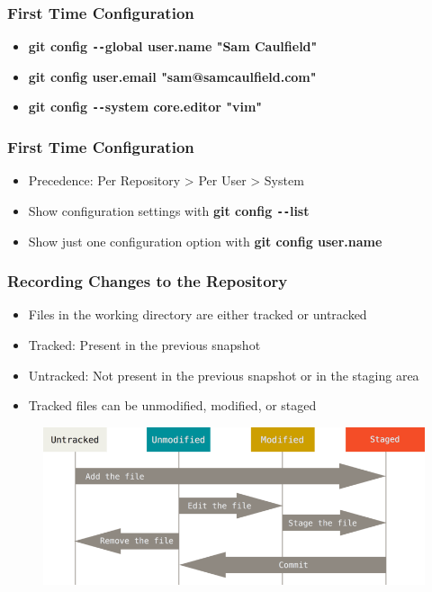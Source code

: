 \documentclass{beamer}
\begin{document}
\begin{frame}
	\frametitle{First Time Configuration}
	\begin{itemize}
		\item{\textbf{git config \texttt{-{}-}global user.name "Sam Caulfield"}}
		\item{\textbf{git config user.email "sam@samcaulfield.com"}}
		\item{\textbf{git config \texttt{-{}-}system core.editor "vim"}}
	\end{itemize}
\end{frame}

\begin{frame}
	\frametitle{First Time Configuration}
	\begin{itemize}
		\item{Precedence: Per Repository \textgreater{} Per User \textgreater{} System}
		\item{Show configuration settings with \textbf{git config \texttt{-{}-}list}}
		\item{Show just one configuration option with \textbf{git config user.name}}
	\end{itemize}

\end{frame}


\begin{frame}
	\frametitle{Recording Changes to the Repository}
	\begin{itemize}
		\item{Files in the working directory are either tracked or untracked}
		\item{Tracked: Present in the previous snapshot}
		\item{Untracked: Not present in the previous snapshot or in the staging area}
		\item{Tracked files can be unmodified, modified, or staged}
	\end{itemize}
	\begin{figure}
		\includegraphics[scale=0.37]{Recording_Changes_to_the_Repository-0.png}
	\end{figure}
\end{frame}
\end{document}
